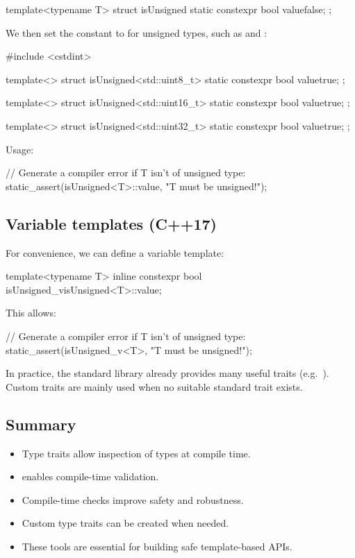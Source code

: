 \begin{cppcode}
template<typename T>
struct isUnsigned
{
    static constexpr bool value{false};
};
\end{cppcode}

\noindent We then set the constant  to  for unsigned types, such as
 and :

\begin{cppcode}
#include <cstdint>

template<>
struct isUnsigned<std::uint8_t>
{
    static constexpr bool value{true};
};

template<>
struct isUnsigned<std::uint16_t>
{
    static constexpr bool value{true};
};

template<>
struct isUnsigned<std::uint32_t>
{
    static constexpr bool value{true};
};
\end{cppcode}

\noindent Usage:

\begin{cppcode}
// Generate a compiler error if T isn't of unsigned type:
static_assert(isUnsigned<T>::value, "T must be unsigned!");
\end{cppcode}

\subsection{Variable templates (C++17)}
\label{c5:sec:variabletemplates}
For convenience, we can define a variable template:

\begin{cppcode}
template<typename T>
inline constexpr bool isUnsigned_v{isUnsigned<T>::value};
\end{cppcode}

\noindent This allows:

\begin{cppcode}
// Generate a compiler error if T isn't of unsigned type:
static_assert(isUnsigned_v<T>, "T must be unsigned!");
\end{cppcode}

\note In practice, the standard library already provides many useful traits (e.g.\
). Custom traits are mainly used when no suitable standard trait exists.

\subsection{Summary}
\label{c5:sec:traitssummary}
\begin{itemize}
  \item Type traits allow inspection of types at compile time.
  \item {} enables compile-time validation.
  \item Compile-time checks improve safety and robustness.
  \item Custom type traits can be created when needed.
  \item These tools are essential for building safe template-based APIs.
\end{itemize}
